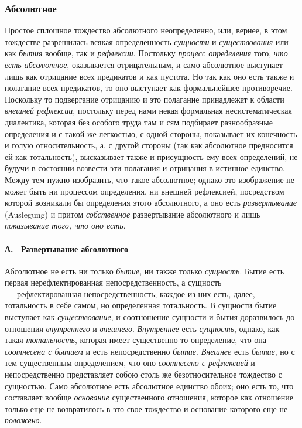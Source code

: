\subsubsection[Первая главаАбсолютное]{\newline
Абсолютное}
\hypertarget{Toc478978759}{}Простое сплошное тождество абсолютного
неопределенно, или, вернее, в этом тождестве разрешилась всякая
определенность {\em сущности} и
{\em существования} или как
{\em бытия} вообще, так и
{\em рефлексии}. Постольку
{\em процесс определения} того,
{\em что есть абсолютное}, оказывается отрицательным, и
само абсолютное выступает лишь как отрицание всех предикатов и как пустота.
Но так как оно есть также и полагание всех предикатов, то оно выступает как
формальнейшее противоречие. Поскольку то подвергание отрицанию и это
полагание принадлежат к области {\em внешней
рефлексии}, постольку перед нами некая формальная несистематическая
диалектика, которая без особого труда там и сям подбирает разнообразные
определения и с такой же легкостью, с одной стороны, показывает их
конечность и голую относительность, а, с другой стороны (так как абсолютное
предносится ей как тотальность), высказывает также и присущность ему всех
определений, не будучи в состоянии возвести эти полагания и отрицания в
истинное единство. — Между тем нужно изобразить, что такое абсолютное;
однако это изображение не может быть ни процессом определения, ни внешней
рефлексией, посредством которой возникали бы определения этого абсолютного,
а оно есть {\em развертывание} (Auslegung) и притом
{\em собственное} развертывание абсолютного и лишь
{\em показывание того, что оно есть}.

\paragraph[А. \ Развертывание абсолютного]{А. \ Развертывание абсолютного}
\hypertarget{Toc478978760}{}Абсолютное не есть ни только
{\em бытие}, ни также только
{\em сущность}. Бытие есть первая нерефлектированная
непосредственность, а сущность —~рефлектированная непосредственность;
каждое из них есть, далее, тотальность в себе самом, но определенная
тотальность. В сущности бытие выступает как
{\em существование}, и соотношение сущности и бытия
доразвилось до отношения {\em внутреннего} и
{\em внешнего}. {\em Внутреннее}
есть {\em сущность}, однако, как такая
{\em тотальность}, которая имеет существенно то
определение, что она {\em соотнесена с бытием} и есть
непосредственно {\em бытие}.
{\em Внешнее} есть {\em бытие}, но
с тем существенным определением, что оно
{\em соотнесено с рефлексией} и непосредственно
представляет собою столь же безотносительное тождество с сущностью. Само
абсолютное есть абсолютное единство обоих; оно есть то, что составляет
вообще {\em основание} существенного отношения, которое
как отношение только еще не возвратилось в это свое тождество и основание
которого еще не {\em положено}.

